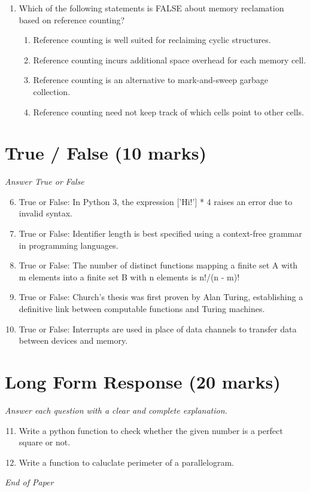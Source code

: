 \documentclass[12pt]{article}
\begin{document}
\begin{enumerate}[label=\arabic*.]
\begin{enumerate}[label=(\alph*)]
    \item xxxxy
\end{enumerate}
\item Which of the following statements is FALSE about memory reclamation based on reference counting?
\begin{enumerate}[label=(\alph*)]
    \item Reference counting is well suited for reclaiming cyclic structures.
    \item Reference counting incurs additional space overhead for each memory cell.
    \item Reference counting is an alternative to mark-and-sweep garbage collection.
    \item Reference counting need not keep track of which cells point to other cells.
\end{enumerate}
\end{enumerate}

\section*{True / False (10 marks)}
\textit{Answer True or False}
\begin{enumerate}[label=\arabic*.]
\setcounter{enumi}{5}
\item True or False: In Python 3, the expression ['Hi!'] * 4 raises an error due to invalid syntax.
\item True or False: Identifier length is best specified using a context-free grammar in programming languages.
\item True or False: The number of distinct functions mapping a finite set A with m elements into a finite set B with n elements is n!/(n - m)!
\item True or False: Church's thesis was first proven by Alan Turing, establishing a definitive link between computable functions and Turing machines.
\item True or False: Interrupts are used in place of data channels to transfer data between devices and memory.
\end{enumerate}

\section*{Long Form Response (20 marks)}
\textit{Answer each question with a clear and complete explanation.}
\begin{enumerate}[label=\arabic*.]
\setcounter{enumi}{10}
\item Write a python function to check whether the given number is a perfect square or not.
\item Write a function to caluclate perimeter of a parallelogram.
\end{enumerate}

\vfill
\noindent\textit{End of Paper}
\end{document}
